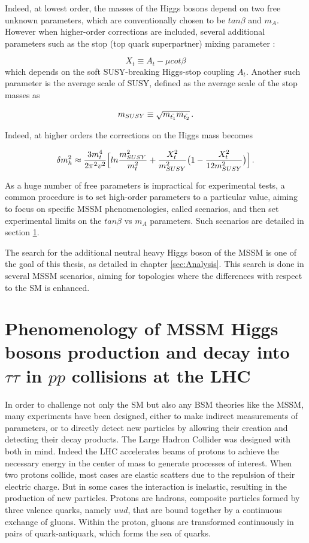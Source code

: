 Indeed, at lowest order, the masses of the Higgs bosons depend on two free unknown parameters, which are conventionally chosen to be $tan \beta$ and $m_A$. However when higher-order corrections are included, several additional parameters such as the stop (top quark superpartner) mixing parameter :

\begin{equation}
    X_t \equiv A_t - \mu cot\beta
\end{equation}
which depends on the soft SUSY-breaking Higgs-stop coupling $A_t$. Another such parameter is the average scale of SUSY, defined as the average scale of the stop masses as

\begin{equation}
    m_{SUSY} \equiv \sqrt{m_{\Tilde{t_1}}m_{\Tilde{t_2}}} \mend
\end{equation}

Indeed, at higher orders the corrections on the Higgs mass becomes \cite{Nagashima:2014tva}

\begin{equation}
    \delta m_h^2 \approx \frac{3 m_t^4}{2\pi^2 v^2} \Big[ ln\frac{m_{SUSY}^2}{m_t^2} + \frac{X_t^2}{m_{SUSY}^2} \big( 1 - \frac{X_t^2}{12 m_{SUSY}^2} \big) \Big] \mend
\end{equation}

As a huge number of free parameters is impractical for experimental tests, a common procedure is to set high-order parameters to a particular value, aiming to focus on specific MSSM phenomenologies, called scenarios, and then set experimental limits on the $tan \beta$ vs $m_A$ parameters. Such scenarios  are detailed in section \ref{sec:pheno}.

The search for the additional neutral heavy Higgs boson of the MSSM is one of the goal of this thesis, as detailed in chapter \ref{sec:Analysis}. This search is done in several MSSM scenarios, aiming for topologies where the differences with respect to the SM is enhanced. 

\section{Phenomenology of MSSM Higgs bosons production and decay into $\tau\tau$ in $pp$ collisions at the LHC}
\label{sec:pheno}

In order to challenge not only the SM but also any BSM theories like the MSSM, many experiments have been designed, either to make indirect measurements of parameters, or to directly detect new particles by allowing their creation and detecting their decay products. The Large Hadron Collider was designed with both in mind. Indeed the LHC accelerates beams of protons to achieve the necessary energy in the center of mass to generate processes of interest. When two protons collide, most cases are elastic scatters due to the repulsion of their electric charge. But in some cases the interaction is inelastic, resulting in the production of new particles. Protons are hadrons, composite particles formed by three valence quarks, namely $uud$, that are bound together by a continuous exchange of gluons. Within the proton, gluons are transformed continuously in pairs of quark-antiquark, which forms the sea of quarks.


